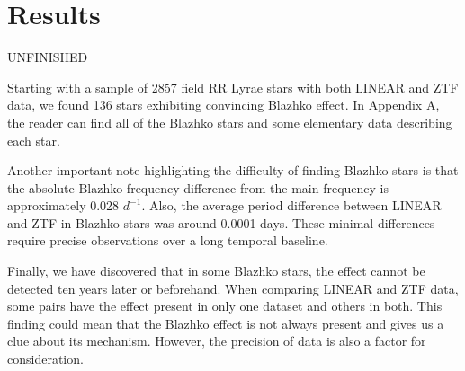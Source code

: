 

\section{Results}\label{sec:results}

UNFINISHED

Starting with a sample of 2857 field RR Lyrae stars with both LINEAR and ZTF data, we found 136 stars exhibiting
convincing Blazhko effect. In Appendix A, the reader can find all of the Blazhko stars and some elementary data
describing each star. 


Another important note highlighting the difficulty of finding Blazhko
stars is that the absolute Blazhko frequency difference from the main
frequency is approximately 0.028 $d^{-1}$. Also, the average period
difference between LINEAR and ZTF in Blazhko stars was around 0.0001
days. These minimal differences require precise observations over a
long temporal baseline.  


Finally, we have discovered that in some Blazhko stars, the effect cannot be detected ten years later or beforehand.
When comparing LINEAR and ZTF data, some pairs have the effect present in only one dataset and others in both.
This finding could mean that the Blazhko effect is not always present and gives us a clue about its mechanism.
However, the precision of data is also a factor for consideration. 


